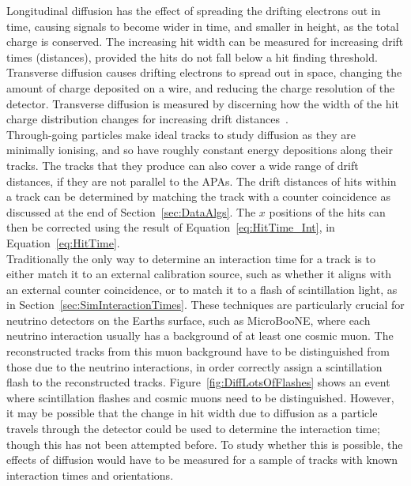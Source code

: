 Longitudinal diffusion has the effect of spreading the drifting electrons out in time, causing signals to become wider in time, and smaller in height, as the total charge is conserved. The increasing hit width can be measured for increasing drift times (distances), provided the hits do not fall below a hit finding threshold. Transverse diffusion causes drifting electrons to spread out in space, changing the amount of charge deposited on a wire, and reducing the charge resolution of the detector. Transverse diffusion is measured by discerning how the width of the hit charge distribution changes for increasing drift distances~\citep{Li:2015rqa}. \\

Through-going particles make ideal tracks to study diffusion as they are minimally ionising, and so have roughly constant energy depositions along their tracks. The tracks that they produce can also cover a wide range of drift distances, if they are not parallel to the APAs. The drift distances of hits within a track can be determined by matching the track with a counter coincidence as discussed at the end of Section~\ref{sec:DataAlgs}. The $x$ positions of the hits can then be corrected using the result of Equation~\ref{eq:HitTime_Int}, in Equation~\ref{eq:HitTime}. \\

Traditionally the only way to determine an interaction time for a track is to either match it to an external calibration source, such as whether it aligns with an external counter coincidence, or to match it to a flash of scintillation light, as in Section~\ref{sec:SimInteractionTimes}. These techniques are particularly crucial for neutrino detectors on the Earths surface, such as MicroBooNE, where each neutrino interaction usually has a background of at least one cosmic muon. The reconstructed tracks from this muon background have to be distinguished from those due to the neutrino interactions, in order correctly assign a scintillation flash to the reconstructed tracks. Figure~\ref{fig:DiffLotsOfFlashes} shows an event where scintillation flashes and cosmic muons need to be distinguished. However, it may be possible that the change in hit width due to diffusion as a particle travels through the detector could be used to determine the interaction time; though this has not been attempted before. To study whether this is possible, the effects of diffusion would have to be measured for a sample of tracks with known interaction times and orientations. \\

